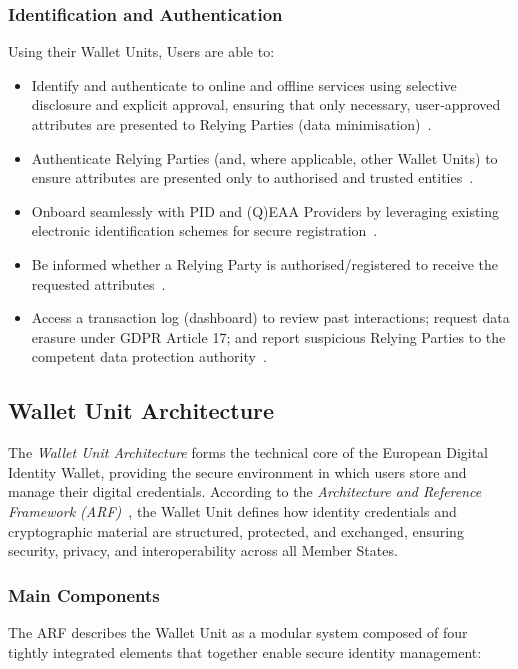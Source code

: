 \documentclass[sigconf,balance,nonacm,authordraft]{acmart}
\begin{document}
\subsubsection*{Identification and Authentication}
Using their Wallet Units, Users are able to:
\begin{itemize}
  \item Identify and authenticate to online and offline services using selective disclosure and explicit approval, ensuring that only necessary, user‑approved attributes are presented to Relying Parties (data minimisation)~\cite{EU_ARF2024}.
  \item Authenticate Relying Parties (and, where applicable, other Wallet Units) to ensure attributes are presented only to authorised and trusted entities~\cite{EU_ARF2024}.
  \item Onboard seamlessly with PID and (Q)EAA Providers by leveraging existing electronic identification schemes for secure registration~\cite{EU_ARF2024}.
  \item Be informed whether a Relying Party is authorised/registered to receive the requested attributes~\cite{EU_ARF2024}.
  \item Access a transaction log (dashboard) to review past interactions; request data erasure under GDPR Article 17; and report suspicious Relying Parties to the competent data protection authority~\cite{EU_ARF2024,EU_eIDAS2024}.
\end{itemize}



\subsection{Wallet Unit Architecture}

The \textit{Wallet Unit Architecture} forms the technical core of the European Digital Identity Wallet, providing the secure environment in which users store and manage their digital credentials. According to the \textit{Architecture and Reference Framework (ARF)}~\cite{EU_ARF2024}, the Wallet Unit defines how identity credentials and cryptographic material are structured, protected, and exchanged, ensuring security, privacy, and interoperability across all Member States.

\subsubsection*{Main Components}

The ARF describes the Wallet Unit as a modular system composed of four tightly integrated elements that together enable secure identity management:
\end{document}
